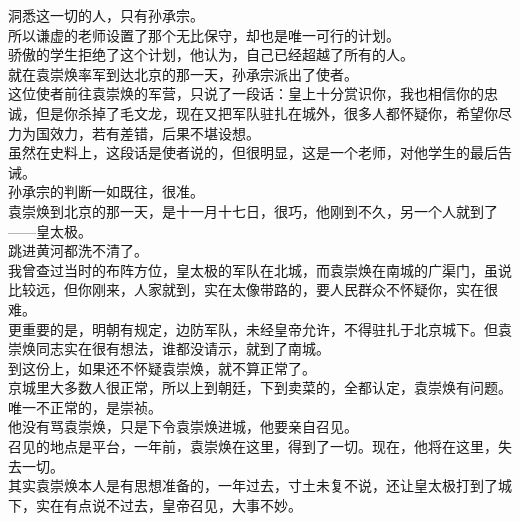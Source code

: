 \begin{multicols}{\theparacolNo}
洞悉这一切的人，只有孙承宗。\\

所以谦虚的老师设置了那个无比保守，却也是唯一可行的计划。\\

骄傲的学生拒绝了这个计划，他认为，自己已经超越了所有的人。\\

就在袁崇焕率军到达北京的那一天，孙承宗派出了使者。\\

这位使者前往袁崇焕的军营，只说了一段话：皇上十分赏识你，我也相信你的忠诚，但是你杀掉了毛文龙，现在又把军队驻扎在城外，很多人都怀疑你，希望你尽力为国效力，若有差错，后果不堪设想。\\

虽然在史料上，这段话是使者说的，但很明显，这是一个老师，对他学生的最后告诫。\\

孙承宗的判断一如既往，很准。\\

袁崇焕到北京的那一天，是十一月十七日，很巧，他刚到不久，另一个人就到了——皇太极。\\

跳进黄河都洗不清了。\\

我曾查过当时的布阵方位，皇太极的军队在北城，而袁崇焕在南城的广渠门，虽说比较远，但你刚来，人家就到，实在太像带路的，要人民群众不怀疑你，实在很难。\\

更重要的是，明朝有规定，边防军队，未经皇帝允许，不得驻扎于北京城下。但袁崇焕同志实在很有想法，谁都没请示，就到了南城。\\

到这份上，如果还不怀疑袁崇焕，就不算正常了。\\

京城里大多数人很正常，所以上到朝廷，下到卖菜的，全都认定，袁崇焕有问题。\\

唯一不正常的，是崇祯。\\

他没有骂袁崇焕，只是下令袁崇焕进城，他要亲自召见。\\

召见的地点是平台，一年前，袁崇焕在这里，得到了一切。现在，他将在这里，失去一切。\\

其实袁崇焕本人是有思想准备的，一年过去，寸土未复不说，还让皇太极打到了城下，实在有点说不过去，皇帝召见，大事不妙。\\


\end{multicols}
